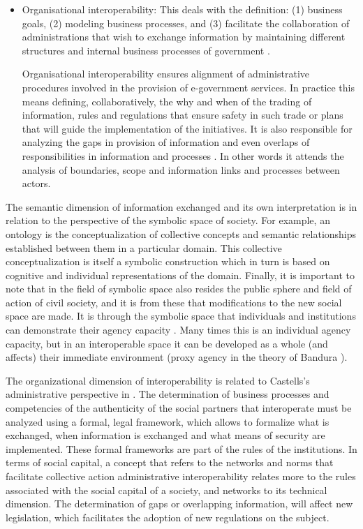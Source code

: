 \documentclass[10pt,twocolumn,ieeetran]{article}
\begin{document}
\begin{itemize}
\item Organisational interoperability: This deals with the definition: (1) business goals, (2) modeling business processes, and (3) facilitate the collaboration of administrations that wish to exchange information by maintaining different structures and internal business processes of government \cite{Moreno}.

Organisational interoperability ensures alignment of administrative procedures involved in the provision of e-government services. In practice this means  defining, collaboratively, the why and when  of  the trading of information, rules and regulations that ensure safety in such trade or plans that will guide the implementation of the initiatives.
It is also responsible for analyzing the gaps in provision of information and even overlaps of responsibilities in information and processes \cite{Moreno}. In other words  it attends  the analysis of boundaries, scope and information links and processes between actors.
\end{itemize}


The semantic dimension of information exchanged and its own interpretation is in relation to the perspective of the symbolic space of society. For example, an ontology is the conceptualization of collective concepts and semantic relationships established between them in a particular domain.
This collective conceptualization is itself a symbolic construction which in turn is based on cognitive and individual representations of the domain. Finally, it is important to note that in the field of symbolic space also resides the public sphere and field of action of civil society, and it is from these that modifications to the new social space are made.
It is through the symbolic space that individuals and institutions can demonstrate their agency capacity  \cite{Bandura}. Many times this is an individual agency capacity, but in an interoperable space  it can be developed as a whole (and affects) their immediate environment (proxy agency in the theory of Bandura \cite{Bandura}).


The organizational dimension of interoperability is related to Castells's administrative perspective in \cite{Castells2}. The determination of business processes and competencies of the authenticity of the social partners that interoperate must be analyzed using a formal, legal framework, which allows to formalize what is exchanged, when information is exchanged and what means of security are implemented. These formal frameworks are part of the rules of the institutions. In terms of social capital, a concept that refers to the networks and norms that facilitate collective action \cite{Woolcock} \cite{Uphoff} \cite{Dahal} \cite{Sobel} \cite{Maseda} administrative interoperability relates more to the rules associated with the social capital of a society, and networks to its technical dimension. The determination of gaps or overlapping information, will affect new legislation, which facilitates the adoption of new regulations on the subject.
\end{document}

